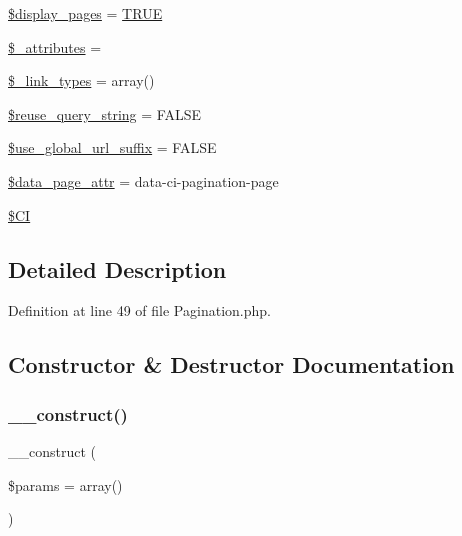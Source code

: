 \begin{DoxyCompactItemize}
\item 
\mbox{\hyperlink{class_c_i___pagination_ab68f1bc9a7442f1936286f05b7ba175d}{\$display\+\_\+pages}} = \mbox{\hyperlink{constants_8php_ae04a3efe6aa42044f803ee90c2277846}{T\+R\+UE}}
\item 
\mbox{\hyperlink{class_c_i___pagination_a891d1c35cfe08f5bf9eb53043b78035d}{\$\+\_\+attributes}} = \textquotesingle{}\textquotesingle{}
\item 
\mbox{\hyperlink{class_c_i___pagination_a6bb16f8a41b808305d99487eaf429717}{\$\+\_\+link\+\_\+types}} = array()
\item 
\mbox{\hyperlink{class_c_i___pagination_aaca516d12ed63aa4523ab88dd46e067d}{\$reuse\+\_\+query\+\_\+string}} = F\+A\+L\+SE
\item 
\mbox{\hyperlink{class_c_i___pagination_aa2ec11ced927cd6f4e62fa19a4e35325}{\$use\+\_\+global\+\_\+url\+\_\+suffix}} = F\+A\+L\+SE
\item 
\mbox{\hyperlink{class_c_i___pagination_a3bbb05bafee2889f825aa40dcd684426}{\$data\+\_\+page\+\_\+attr}} = \textquotesingle{}data-\/ci-\/pagination-\/page\textquotesingle{}
\item 
\mbox{\hyperlink{class_c_i___pagination_ae0314d046ddf7fcfaec03222977427d3}{\$\+CI}}
\end{DoxyCompactItemize}


\subsection{Detailed Description}


Definition at line 49 of file Pagination.\+php.



\subsection{Constructor \& Destructor Documentation}
\mbox{\label{class_c_i___pagination_a568ecdb0d73d2a870f33189739922a50}} 
\subsubsection{\texorpdfstring{\_\_construct()}{\_\_construct()}}
{\footnotesize\ttfamily \+\_\+\+\_\+construct (\begin{DoxyParamCaption}\item[{}]{\$params = {\ttfamily array()} }\end{DoxyParamCaption})}

